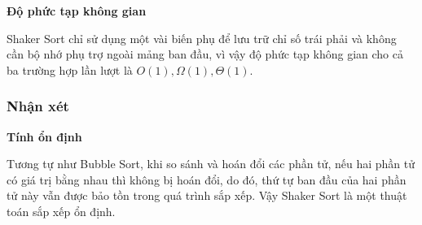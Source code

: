 \textbf{Độ phức tạp không gian}

Shaker Sort chỉ sử dụng một vài biến phụ để lưu trữ chỉ số trái phải và không cần bộ nhớ phụ trợ ngoài mảng ban đầu, vì vậy độ phức tạp không gian cho cả ba trường hợp lần lượt là $O(1), \Omega(1), \Theta(1)$.

\subsubsection{Nhận xét}

\textbf{Tính ổn định} 

Tương tự như Bubble Sort, khi so sánh và hoán đổi các phần tử, nếu hai phần tử có giá trị bằng nhau thì không bị hoán đổi, do đó, thứ tự ban đầu của hai phần tử này vẫn được bảo tồn trong quá trình sắp xếp. Vậy Shaker Sort là một thuật toán sắp xếp ổn định.


